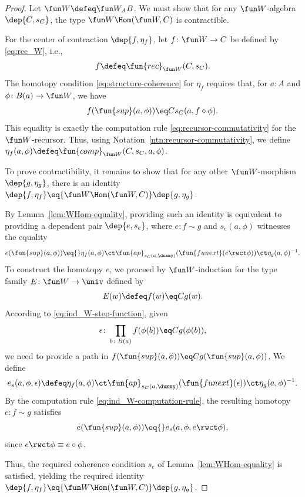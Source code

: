 \begin{proof}
    Let $\fun W\defeq\fun W_AB$. We must show that for any $\fun W$-algebra $\dep{C,s_C}$, the type $\fun W\Hom(\fun W,C)$ is contractible. 
    
    For the center of contraction $\dep{f,\eta_f}$, let $f\colon\fun W\to C$ be defined by \eqref{eq:rec_W}, i.e.,
    \[
        f\defeq\fun{rec}_{\fun W}(C,s_C).
    \]
    The homotopy condition \eqref{eq:structure-coherence} for $\eta_f$ requires that, for $a\colon A$ and $\phi\colon B(a)\to\fun W$, we have
    \[
        f(\fun{sup}(a,\phi))\eq Cs_C(a,f\circ\phi).
    \]
    This equality is exactly the computation rule \eqref{eq:recursor-commutativity} for the $\fun W$-recursor. Thus, using Notation~\ref{ntn:recursor-commutativity}, we define $\eta_f(a,\phi)\defeq\fun{comp}_{\fun W}(C,s_C,a,\phi)$.

    To prove contractibility, it remains to show that for any other $\fun W$-morphism $\dep{g,\eta_g}$, there is an identity $\dep{f,\eta_f}\eq{\fun W\Hom(\fun W,C)}\dep{g,\eta_g}$. 
    
    By Lemma~\ref{lem:WHom-equality}, providing such an identity is equivalent to providing a dependent pair $\dep{e,s_e}$, where $e\colon f\sim g$ and $s_e(a,\phi)$ witnesses the equality
    \[
        e(\fun{sup}(a,\phi))\eq{}
        \eta_f(a,\phi)
        \ct\fun{ap}_{s_C(a,\dummy)}
            (\fun{funext}(e\rwct\phi))
        \ct \eta_g(a,\phi)^{-1}.
    \]
    To construct the homotopy $e$, we proceed by $\fun W$-induction for the type family $E\colon\fun W\to\univ$ defined by
    \[
        E(w)\defeq f(w)\eq Cg(w).
    \]
    According to \eqref{eq:ind_W-step-function}, given
    \[
        \epsilon\colon\prod_{b\colon B(a)}
            f(\phi(b))\eq Cg(\phi(b)),
    \]
    we need to provide a path in $f(\fun{sup}(a,\phi))\eq Cg(\fun{sup}(a,\phi))$. We define
    \[
        e_s(a,\phi,\epsilon)\defeq
            \eta_f(a,\phi)
            \ct\fun{ap}_{s_C(a,\dummy)}
                (\fun{funext}(\epsilon))
            \ct\eta_g(a,\phi)^{-1}.
    \]
    By the computation rule \eqref{eq:ind_W-computation-rule}, the resulting homotopy $e\colon f\sim g$ satisfies
    \[
        e(\fun{sup}(a,\phi))\eq{}e_s(a,\phi,e\rwct\phi),
    \]
    since $e\rwct\phi\equiv e\circ\phi$.
    
    Thus, the required coherence condition $s_e$ of Lemma~\ref{lem:WHom-equality} is satisfied, yielding the required identity $\dep{f,\eta_f}\eq{\fun W\Hom(\fun W,C)}\dep{g,\eta_g}$.
    
\end{proof}
